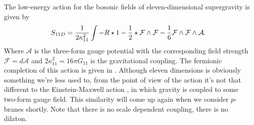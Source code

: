The low-energy action for the bosonic fields of eleven-dimensional supergravity is given by
\begin{equation}
\label{eq:11daction}
	S_{11D} = \frac{1}{2 \kappa_{11}^2} \int -R \star 1 - \frac{1}{2} \star \mathcal{F} \wedge \mathcal{F} - \frac{1}{6} \mathcal{F} \wedge \mathcal{F} \wedge \mathcal{A}.
\end{equation}
Where $\mathcal{A}$ is the three-form gauge potential with the corresponding field strength $\mathcal{F} = d\mathcal{A}$ and $2\kappa^2_{11} = 16\pi G_{11}$ is the gravitational coupling. The fermionic completion of this action is given in \cite{Cremmer:1978km}. Although eleven dimensions is obviously something we're less used to, from the point of view of the action it's not that different to the Einstein-Maxwell action , in which gravity is coupled to some two-form gauge field. This similarity will come up again when we consider $p$-branes shortly. Note that there is no scale dependent coupling, \ie there is no dilaton. 

